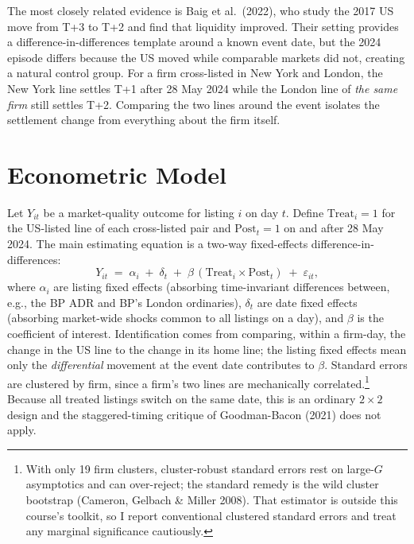 \documentclass[11pt]{article}
\begin{document}
The most closely related evidence is Baig et al.\ (2022), who study the 2017 US
move from T+3 to T+2 and find that liquidity improved. Their setting provides a difference-in-differences template around a known event date, but the 2024 episode differs because the US moved while comparable markets did not, creating a natural control group. For a firm
cross-listed in New York and London, the New York line settles T+1 after 28 May
2024 while the London line of \emph{the same firm} still settles T+2. Comparing the
two lines around the event isolates the settlement change from everything about the
firm itself.

\section{Econometric Model}
Let $Y_{it}$ be a market-quality outcome for listing $i$ on day $t$. Define
$\text{Treat}_i = 1$ for the US-listed line of each cross-listed pair and
$\text{Post}_t = 1$ on and after 28 May 2024. The main estimating equation is a
two-way fixed-effects difference-in-differences:
\begin{equation}
Y_{it} \;=\; \alpha_i \;+\; \delta_t \;+\; \beta\,(\text{Treat}_i \times \text{Post}_t) \;+\; \varepsilon_{it},
\label{eq:did}
\end{equation}
where $\alpha_i$ are listing fixed effects (absorbing time-invariant differences
between, e.g., the BP ADR and BP's London ordinaries), $\delta_t$ are date fixed
effects (absorbing market-wide shocks common to all listings on a day), and
$\beta$ is the coefficient of interest. Identification comes from comparing, within
a firm-day, the change in the US line to the change in its home line; the listing
fixed effects mean only the \emph{differential} movement at the event date
contributes to $\beta$. Standard errors are clustered by firm, since a firm's two
lines are mechanically correlated.\footnote{With only 19 firm clusters,
cluster-robust standard errors rest on large-$G$ asymptotics and can over-reject;
the standard remedy is the wild cluster bootstrap (Cameron, Gelbach \& Miller
2008). That estimator is outside this course's toolkit, so I report conventional
clustered standard errors and treat any marginal significance cautiously.} Because
all treated listings switch on the same date, this is an ordinary $2\times2$
design and the staggered-timing critique of Goodman-Bacon (2021) does not apply.
\end{document}
